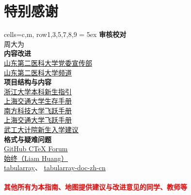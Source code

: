 \chapter*{特别感谢}
\begin{tblr}[
        long,
        theme=no-caption
    ]{
        cells={c,m},
        row{1,3,5,7,8,9} = {5ex}
    }
    {\large\textbf{审核校对}}                                                             \\
    {周大为}                                                                              \\
    {\large\textbf{内容改进}}                                                             \\
    {
    \uline{\href{https://xchb.sdsmu.edu.cn/}{山东第二医科大学党委宣传部}}                 \\
    \uline{\href{https://pd.qq.com/s/7mekdr5ve}{山东第二医科大学频道}}
    }                                                                                     \\
    {\large\textbf{项目结构与内容}}                                                       \\
    {
    \uline{\href{https://zjuers.com/welcome/}{浙江大学本科新生指引}}                      \\
    \uline{\href{https://survivesjtu.gitbook.io/survivesjtumanual}{上海交通大学生存手册}} \\
    \uline{\href{https://sustech-application.com/}{南方科技大学飞跃手册}}                 \\
    \uline{\href{https://survivesjtu.github.io/SJTU-Application/}{上海交通大学飞跃手册}}  \\
    \uline{\href{https://gitee.com/hanyaner/witjij}{武工大计院新生入学建议}}
    }                                                                                     \\
    {\large\textbf{格式与疑难问题}}                                                       \\
    {
    \uline{\href{https://github.com/CTeX-org/forum/issues}{GitHub CTeX Forum}}            \\
    \uline{\href{https://liam.page}{始终（Liam Huang）}}                                  \\
    \uline{\href{https://github.com/lvjr/tabularray}{tabularray}}、%
    \uline{\href{https://gitee.com/nwafu_nan/tabularray-doc-zh-cn}{tabularray-doc-zh-cn}}
    }                                                                                     \\
    \\
    {\large\textbf{\textcolor{red}{其他所有为本指南、地图提供建议与改进意见的同学、教师等}}}
\end{tblr}

